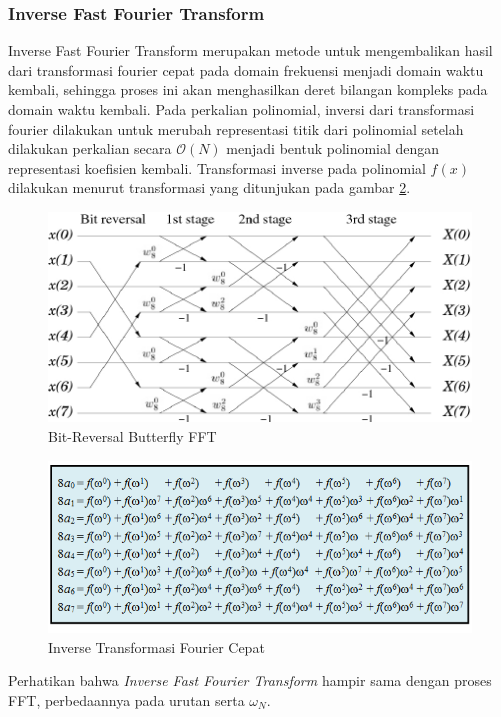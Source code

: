 \subsubsection{Inverse Fast Fourier Transform} Inverse Fast Fourier Transform merupakan metode untuk mengembalikan hasil dari transformasi fourier cepat pada domain frekuensi menjadi domain waktu kembali, sehingga proses ini akan menghasilkan deret bilangan kompleks pada domain waktu kembali. Pada perkalian polinomial, inversi dari transformasi fourier dilakukan untuk merubah representasi titik dari polinomial setelah dilakukan perkalian secara $ \mathcal{O}{(N)} $ menjadi bentuk polinomial dengan representasi koefisien kembali. Transformasi inverse pada polinomial $ f(x) $ dilakukan menurut transformasi yang ditunjukan pada gambar \ref{fig:inverse-fft}.
\begin{figure}
	\Centering
	\includegraphics [scale=0.7]{bab2/img/bit-reverse-fft-butterfly}
	\caption {Bit-Reversal Butterfly FFT}
	\label {fig:bit-reverse-fft-butterfly}
\end{figure}

\begin{figure}
	\Centering
	\includegraphics [scale=0.6]{bab2/img/inverse-fft}
	\caption {Inverse Transformasi Fourier Cepat}
	\label {fig:inverse-fft}
\end{figure}
Perhatikan bahwa \textit{Inverse Fast Fourier Transform} hampir sama dengan proses FFT, perbedaannya pada urutan serta $ \omega_N $.

